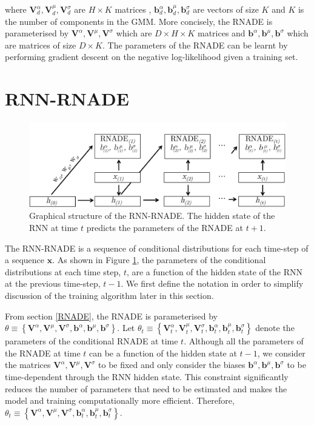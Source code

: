 \documentclass{article} %
\begin{document}
where $ \mathbf{V}_{d}^{\alpha},\mathbf{V}_{d}^{\mu},\mathbf{V}_{d}^{\sigma}$ are $H \times K$ matrices , $\mathbf{b}^{\alpha}_{d},\mathbf{b}^{\mu}_{d},\mathbf{b}^{\sigma}_{d}$ are vectors of size $K$ and $K$ is the number of components in the GMM. More concisely, the RNADE is parameterised by $\mathbf{V}^{\alpha},\mathbf{V}^{\mu},\mathbf{V}^{\sigma}$ which are $D \times H \times K$ matrices and $\mathbf{b}^{\alpha},\mathbf{b}^{\mu},\mathbf{b}^{\sigma}$ which are matrices of size $D \times K $.
The parameters of the RNADE can be learnt by performing gradient descent on the negative log-likelihood given a training set. 

\section{RNN-RNADE}
\label{RNN-RNADE}

\begin{figure}
        \centering
    \includegraphics[scale=0.65]{RNN-RNADE.pdf}
    \caption{Graphical structure of the RNN-RNADE. The hidden state of the RNN at time $t$ predicts the parameters of the RNADE at $t+1$. }
    \label{fig:rnn-rnade}
\end{figure}


The RNN-RNADE is a sequence of conditional distributions for each time-step of a sequence $\mathbf{x}$. As shown in Figure \ref{fig:rnn-rnade}, the parameters of the conditional distributions at each time step, $t$, are a function of the hidden state of the RNN at the previous time-step, $t-1$. We first define the notation in order to simplify discussion of the training algorithm later in this section. 

From section \ref{RNADE}, the RNADE is parameterised by $ \theta \equiv \left\{ \mathbf{V}^{\alpha},\mathbf{V}^{\mu},\mathbf{V}^{\sigma},\mathbf{b}^{\alpha},\mathbf{b}^{\mu},\mathbf{b}^{\sigma} \right\}$. Let  $ \theta_t \equiv \left\{ \mathbf{V}^{\alpha}_{t},\mathbf{V}^{\mu}_{t},\mathbf{V}^{\sigma}_{t},\mathbf{b}^{\alpha}_{t},\mathbf{b}^{\mu}_{t},\mathbf{b}^{\sigma}_{t} \right\}$ denote the parameters of the conditional RNADE at time $t$. Although all the parameters of the RNADE at time $t$ can be a function of the hidden state at $t-1$, we consider the matrices $ \mathbf{V}^{\alpha},\mathbf{V}^{\mu},\mathbf{V}^{\sigma}$ to be fixed and only consider the biases $\mathbf{b}^{\alpha},\mathbf{b}^{\mu},\mathbf{b}^{\sigma}$ to be time-dependent through the RNN hidden state. This constraint significantly reduces the number of parameters that need to be estimated and makes the model and training computationally more efficient. 
Therefore, $ \theta_t \equiv \left\{ \mathbf{V}^{\alpha},\mathbf{V}^{\mu},\mathbf{V}^{\sigma},\mathbf{b}^{\alpha}_{t},\mathbf{b}^{\mu}_{t},\mathbf{b}^{\sigma}_{t} \right\}$. 
\end{document}
